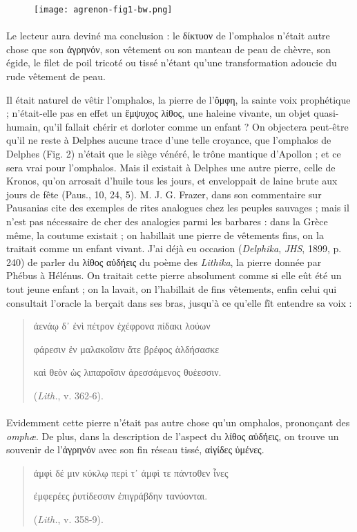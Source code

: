 \documentclass[a4paper, 11pt, oneside, polutonikogreek, french]{article}
\begin{document}
\begin{figure}[ht]
\centering
\texttt{[image: agrenon-fig1-bw.png]}
\end{figure}
\paragraph{}
Le lecteur aura deviné ma conclusion : le δίκτυον de l'omphalos n'était autre chose que son ἀγρηνόν, son vêtement ou son manteau de peau de chèvre, son égide, le filet de poil tricoté ou tissé n'étant qu'une transformation adoucie du rude vêtement de peau.

Il était naturel de vêtir l'omphalos, la pierre de l'ὄμφη, la sainte voix prophétique ; n'était-elle pas en effet un ἔμψυχος λίθος, une haleine vivante, un objet quasi-humain, qu'il fallait chérir et dorloter comme un enfant ? On objectera peut-être qu'il ne reste à Delphes aucune trace d'une telle croyance, que l'omphalos de Delphes (Fig. 2) n'était que le siège vénéré, le trône mantique d'Apollon ; et ce sera vrai pour l'omphalos. Mais il existait à Delphes une autre pierre, celle de Kronos, qu'on arrosait d'huile tous les jours, et enveloppait de laine brute aux jours de fête (Paus., 10, 24, 5). M. J. G. Frazer, dans son commentaire sur Pausanias cite des exemples de rites analogues chez les peuples sauvages ; mais il n'est pas nécessaire de cher des analogies parmi les barbares : dans la Grèce même, la coutume existait ; on habillait une pierre de vêtements fins, on la traitait comme un enfant vivant. J'ai déjà eu occasion (\emph{Delphika}, \emph{JHS}, 1899, p. 240) de parler du λίθος αὐδήεις du poème des \emph{Lithika}, la pierre donnée par Phébus à Hélénus. On traitait cette pierre absolument comme si elle eût été un tout jeune enfant ; on la lavait, on l'habillait de fins vêtements, enfin celui qui consultait l'oracle la berçait dans ses bras, jusqu'à ce qu'elle fît entendre sa voix :
\begin{quotation}\normalsize
ἀενάῳ δ᾽ ἐνὶ πέτρον ἐχέφρονα πίδακι λούων

φάρεσιν ἐν μαλακοῖσιν ἅτε βρέφος ἀλδήσασκε

καὶ θεὸν ὡς λιπαροῖσιν ἀρεσσάμενος θυέεσσιν.

(\emph{Lith.}, v. 362-6).
\end{quotation}
\paragraph{}
Evidemment cette pierre n'était pas autre chose qu'un omphalos, prononçant des \emph{omphæ}. De plus, dans la description de l'aspect du λίθος αὐδήεις, on trouve un souvenir de l'ἀγρηνόν avec son fin réseau tissé, αἰγίδες ὑμένες.
\begin{quotation}\normalsize
ἀμφὶ δέ μιν κύκλῳ περὶ τ᾽ ἀμφὶ τε πάντοθεν ἶνες

ἐμφερέες ῥυτίδεσσιν ἐπιγράβδην τανύονται.

(\emph{Lith.}, v. 358-9).
\end{quotation}
\end{document}

